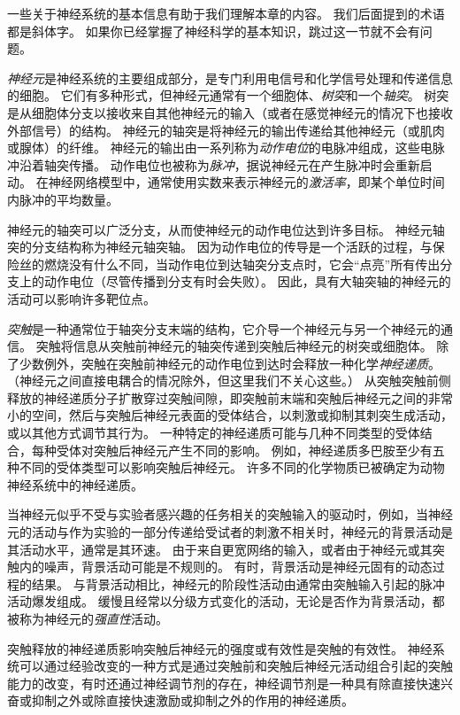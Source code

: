 一些关于神经系统的基本信息有助于我们理解本章的内容。
我们后面提到的术语都是斜体字。
如果你已经掌握了神经科学的基本知识，跳过这一节就不会有问题。


\textit{神经元}是神经系统的主要组成部分，是专门利用电信号和化学信号处理和传递信息的细胞。
它们有多种形式，但神经元通常有一个细胞体、\textit{树突}和一个\textit{轴突}。
树突是从细胞体分支以接收来自其他神经元的输入（或者在感觉神经元的情况下也接收外部信号）的结构。
神经元的轴突是将神经元的输出传递给其他神经元（或肌肉或腺体）的纤维。
神经元的输出由一系列称为\textit{动作电位}的电脉冲组成，这些电脉冲沿着轴突传播。
动作电位也被称为\textit{脉冲}，据说神经元在产生脉冲时会重新启动。
在神经网络模型中，通常使用实数来表示神经元的\textit{激活率}，即某个单位时间内脉冲的平均数量。


神经元的轴突可以广泛分支，从而使神经元的动作电位达到许多目标。
神经元轴突的分支结构称为神经元轴突轴。
因为动作电位的传导是一个活跃的过程，与保险丝的燃烧没有什么不同，当动作电位到达轴突分支点时，它会“点亮”所有传出分支上的动作电位（尽管传播到分支有时会失败）。
因此，具有大轴突轴的神经元的活动可以影响许多靶位点。


\textit{突触}是一种通常位于轴突分支末端的结构，它介导一个神经元与另一个神经元的通信。
突触将信息从突触前神经元的轴突传递到突触后神经元的树突或细胞体。
除了少数例外，突触在突触前神经元的动作电位到达时会释放一种化学\textit{神经递质}。
（神经元之间直接电耦合的情况除外，但这里我们不关心这些。）
从突触突触前侧释放的神经递质分子扩散穿过突触间隙，即突触前末端和突触后神经元之间的非常小的空间，然后与突触后神经元表面的受体结合，以刺激或抑制其刺突生成活动，或以其他方式调节其行为。
一种特定的神经递质可能与几种不同类型的受体结合，每种受体对突触后神经元产生不同的影响。
例如，神经递质多巴胺至少有五种不同的受体类型可以影响突触后神经元。
许多不同的化学物质已被确定为动物神经系统中的神经递质。


当神经元似乎不受与实验者感兴趣的任务相关的突触输入的驱动时，例如，当神经元的活动与作为实验的一部分传递给受试者的刺激不相关时，神经元的背景活动是其活动水平，通常是其环速。
由于来自更宽网络的输入，或者由于神经元或其突触内的噪声，背景活动可能是不规则的。
有时，背景活动是神经元固有的动态过程的结果。
与背景活动相比，神经元的阶段性活动由通常由突触输入引起的脉冲活动爆发组成。
缓慢且经常以分级方式变化的活动，无论是否作为背景活动，都被称为神经元的\textit{强直性}活动。


突触释放的神经递质影响突触后神经元的强度或有效性是突触的有效性。
神经系统可以通过经验改变的一种方式是通过突触前和突触后神经元活动组合引起的突触能力的改变，有时还通过神经调节剂的存在，神经调节剂是一种具有除直接快速兴奋或抑制之外或除直接快速激励或抑制之外的作用的神经递质。


